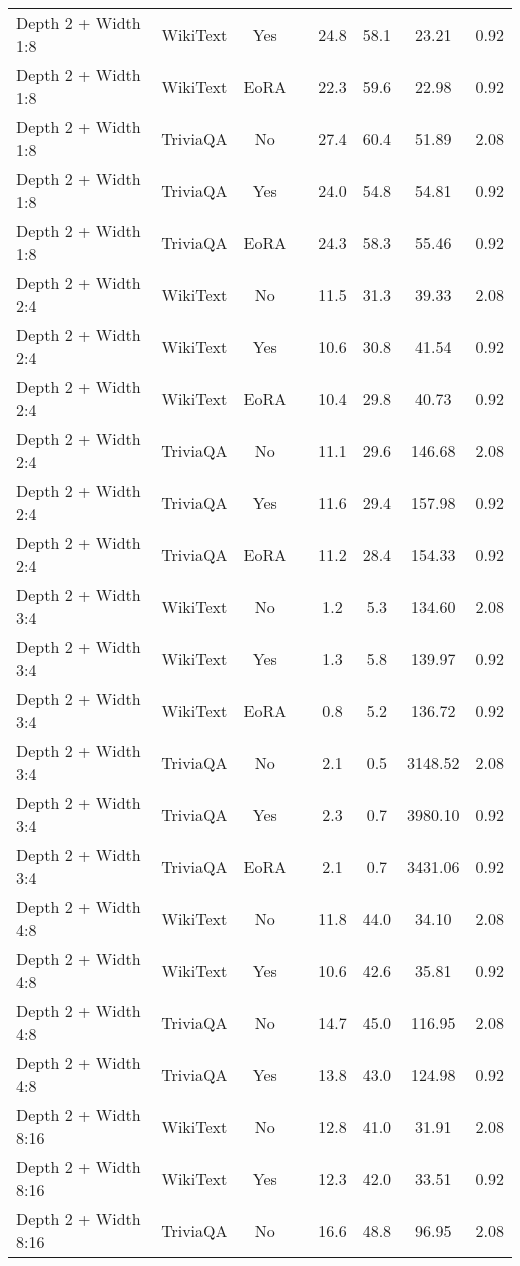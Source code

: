 \begin{longtable}{lcclcccc}
Depth 2 + Width 1:8 & WikiText & Yes & & 24.8 & 58.1 & 23.21 & 0.92 \\
Depth 2 + Width 1:8 & WikiText & EoRA & & 22.3 & 59.6 & 22.98 & 0.92 \\
Depth 2 + Width 1:8 & TriviaQA & No & & 27.4 & 60.4 & 51.89 & 2.08 \\
Depth 2 + Width 1:8 & TriviaQA & Yes & & 24.0 & 54.8 & 54.81 & 0.92 \\
Depth 2 + Width 1:8 & TriviaQA & EoRA & & 24.3 & 58.3 & 55.46 & 0.92 \\
Depth 2 + Width 2:4 & WikiText & No & & 11.5 & 31.3 & 39.33 & 2.08 \\
Depth 2 + Width 2:4 & WikiText & Yes & & 10.6 & 30.8 & 41.54 & 0.92 \\
Depth 2 + Width 2:4 & WikiText & EoRA & & 10.4 & 29.8 & 40.73 & 0.92 \\
Depth 2 + Width 2:4 & TriviaQA & No & & 11.1 & 29.6 & 146.68 & 2.08 \\
Depth 2 + Width 2:4 & TriviaQA & Yes & & 11.6 & 29.4 & 157.98 & 0.92 \\
Depth 2 + Width 2:4 & TriviaQA & EoRA & & 11.2 & 28.4 & 154.33 & 0.92 \\
Depth 2 + Width 3:4 & WikiText & No & & 1.2 & 5.3 & 134.60 & 2.08 \\
Depth 2 + Width 3:4 & WikiText & Yes & & 1.3 & 5.8 & 139.97 & 0.92 \\
Depth 2 + Width 3:4 & WikiText & EoRA & & 0.8 & 5.2 & 136.72 & 0.92 \\
Depth 2 + Width 3:4 & TriviaQA & No & & 2.1 & 0.5 & 3148.52 & 2.08 \\
Depth 2 + Width 3:4 & TriviaQA & Yes & & 2.3 & 0.7 & 3980.10 & 0.92 \\
Depth 2 + Width 3:4 & TriviaQA & EoRA & & 2.1 & 0.7 & 3431.06 & 0.92 \\
Depth 2 + Width 4:8 & WikiText & No & & 11.8 & 44.0 & 34.10 & 2.08 \\
Depth 2 + Width 4:8 & WikiText & Yes & & 10.6 & 42.6 & 35.81 & 0.92 \\
Depth 2 + Width 4:8 & TriviaQA & No & & 14.7 & 45.0 & 116.95 & 2.08 \\
Depth 2 + Width 4:8 & TriviaQA & Yes & & 13.8 & 43.0 & 124.98 & 0.92 \\
Depth 2 + Width 8:16 & WikiText & No & & 12.8 & 41.0 & 31.91 & 2.08 \\
Depth 2 + Width 8:16 & WikiText & Yes & & 12.3 & 42.0 & 33.51 & 0.92 \\
Depth 2 + Width 8:16 & TriviaQA & No & & 16.6 & 48.8 & 96.95 & 2.08 \\

\end{longtable}
